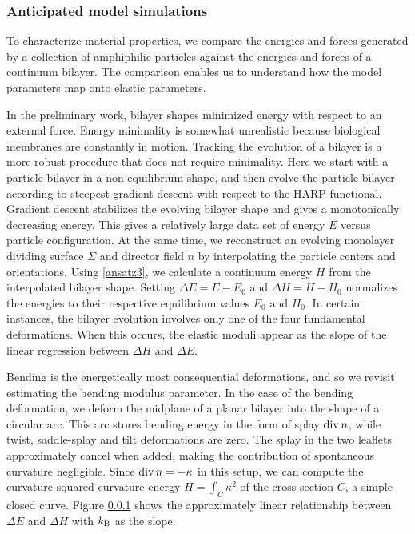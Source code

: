 \subsubsection{Anticipated model simulations}
To characterize material properties, we compare the energies and forces generated by
a collection of amphiphilic particles against the energies and forces of a continuum bilayer.
The comparison enables us to understand how the model parameters map onto elastic parameters. 

In the preliminary work, bilayer shapes minimized energy with respect to an external force. Energy minimality is somewhat unrealistic because
biological membranes are constantly in motion. Tracking the evolution of a bilayer is a more robust procedure that does not require minimality.
Here we start with a particle bilayer in a non-equilibrium shape, and then evolve the particle bilayer according to steepest gradient descent with respect to the
HARP functional. Gradient descent stabilizes the evolving bilayer shape and gives a monotonically decreasing energy. This gives a relatively large
data set of energy $E$ versus particle configuration. At the same time, we reconstruct an evolving monolayer dividing surface $\Sigma$ and director field $n$ by
interpolating the particle centers and orientations. Using \eqref{ansatz3}, we calculate a continuum energy $H$ from the interpolated
bilayer shape. Setting $\Delta E = E - E_0$ and $\Delta H = H - H_0$ normalizes the energies to their respective equilibrium values $E_0$ and $H_0$.
In certain instances, the bilayer evolution involves only one of the four fundamental deformations.
When this occurs, the elastic moduli appear as the slope of the linear regression between $\Delta H$ and $\Delta E$. 

Bending is the energetically most consequential deformations,
and so we revisit estimating the bending modulus parameter. 
In the case of the bending deformation, we deform the midplane of a planar bilayer into the shape of a circular arc.
This arc stores bending energy in the form of splay $\operatorname{div}{n}$, while twist, saddle-splay and tilt deformations are zero.
The splay in the two leaflets approximately cancel when added, making the contribution of spontaneous curvature negligible.
Since $\operatorname{div}{n} = -\kappa$ in this setup, we can compute the curvature squared curvature energy 
$H = \int_C \kappa^2$ of the cross-section $C$, a simple closed curve. Figure \ref{} shows the approximately linear
relationship between $\Delta E$ and $\Delta H$ with $k_{\mathrm{B}}$ as the slope.

